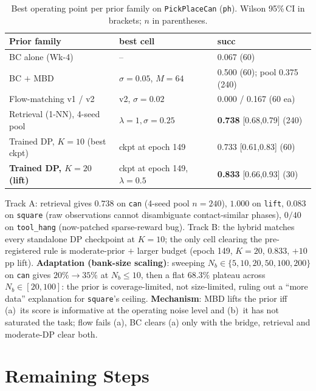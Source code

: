 \documentclass[letterpaper, 10 pt, conference]{ieeeconf}
\begin{document}
\begin{table}[h]
\centering\scriptsize
\setlength{\tabcolsep}{2.5pt}
\renewcommand{\arraystretch}{0.95}
\caption{Best operating point per prior family on
\texttt{PickPlaceCan} (\texttt{ph}). Wilson 95\%\,CI in
brackets; $n$ in parentheses.}
\label{tab:priors}
\begin{tabular}{@{}lll@{}}
\hline
Prior family & best cell & succ \\
\hline
BC alone (Wk-4)                      & --                                & 0.067 (60) \\
BC $+$ MBD                            & $\sigma\!=\!0.05$, $M\!=\!64$     & 0.500 (60); pool 0.375 (240) \\
Flow-matching v1 / v2                & v2, $\sigma\!=\!0.02$             & 0.000 / 0.167 (60 ea) \\
Retrieval (1-NN), 4-seed pool        & $\lambda\!=\!1,\sigma\!=\!0.25$   & \textbf{0.738} [0.68,0.79] (240) \\
Trained DP, $K\!=\!10$ (best ckpt)    & ckpt at epoch 149                 & 0.733 [0.61,0.83] (60) \\
\textbf{Trained DP, $K\!=\!20$ (lift)}& ckpt at epoch 149, $\lambda\!=\!0.5$ & \textbf{0.833} [0.66,0.93] (30) \\
\hline
\end{tabular}
\end{table}

Track A: retrieval gives $\mathbf{0.738}$ on \texttt{can}
(4-seed pool $n\!=\!240$), $\mathbf{1.000}$ on \texttt{lift},
$\mathbf{0.083}$ on \texttt{square} (raw observations cannot
disambiguate contact-similar phases), $0/40$ on
\texttt{tool\_hang} (now-patched sparse-reward bug). Track B:
the hybrid matches every standalone DP checkpoint at $K\!=\!10$;
the only cell clearing the pre-registered rule is moderate-prior
$+$ larger budget (epoch 149, $K\!=\!20$, $\mathbf{0.833}$,
$+10$ pp lift). \textbf{Adaptation (bank-size scaling)}: sweeping
$N_b\!\in\!\{5,10,20,50,100,200\}$ on \texttt{can} gives
$20\%\!\to\!35\%$ at $N_b\!\le\!10$, then a flat $\mathbf{68.3\%}$
plateau across $N_b\!\in\![20,100]$: the prior is
coverage-limited, not size-limited, ruling out a
``more data'' explanation for \texttt{square}'s ceiling.
\textbf{Mechanism}: MBD lifts the prior iff (a)~its score is
informative at the operating noise level and (b)~it has not
saturated the task; flow fails (a), BC clears (a) only with the
bridge, retrieval and moderate-DP clear both.

\section{Remaining Steps}
\end{document}
